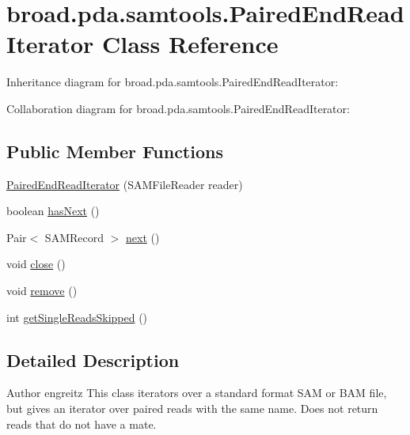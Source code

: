 \hypertarget{classbroad_1_1pda_1_1samtools_1_1_paired_end_read_iterator}{\section{broad.\+pda.\+samtools.\+Paired\+End\+Read\+Iterator Class Reference}
\label{classbroad_1_1pda_1_1samtools_1_1_paired_end_read_iterator}
}


Inheritance diagram for broad.\+pda.\+samtools.\+Paired\+End\+Read\+Iterator\+:


Collaboration diagram for broad.\+pda.\+samtools.\+Paired\+End\+Read\+Iterator\+:
\subsection*{Public Member Functions}
\begin{DoxyCompactItemize}
\item 
\hyperlink{classbroad_1_1pda_1_1samtools_1_1_paired_end_read_iterator_a21df478249257e363685314b73d40ee1}{Paired\+End\+Read\+Iterator} (S\+A\+M\+File\+Reader reader)
\item 
boolean \hyperlink{classbroad_1_1pda_1_1samtools_1_1_paired_end_read_iterator_a5f08593562a867b63ab262fbda5ed6e7}{has\+Next} ()
\item 
Pair$<$ S\+A\+M\+Record $>$ \hyperlink{classbroad_1_1pda_1_1samtools_1_1_paired_end_read_iterator_ac17685b591b5d334cfb2c17adaf97c08}{next} ()
\item 
void \hyperlink{classbroad_1_1pda_1_1samtools_1_1_paired_end_read_iterator_a680e5116d46574fe21e8a0f9621fdcb2}{close} ()
\item 
void \hyperlink{classbroad_1_1pda_1_1samtools_1_1_paired_end_read_iterator_a4029eb2bd2148a3d626ac903450020d6}{remove} ()
\item 
int \hyperlink{classbroad_1_1pda_1_1samtools_1_1_paired_end_read_iterator_afa19ac960a85e684e8f5be020a5cf479}{get\+Single\+Reads\+Skipped} ()
\end{DoxyCompactItemize}


\subsection{Detailed Description}
\begin{DoxyAuthor}{Author}
engreitz This class iterators over a standard format S\+A\+M or B\+A\+M file, but gives an iterator over paired reads with the same name. Does not return reads that do not have a mate. 
\end{DoxyAuthor}


